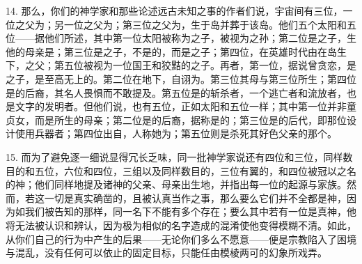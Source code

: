 14. 那么，你们的神学家和那些论述远古未知之事的作者们说，宇宙间有三位，一位之父为；另一位之父为；第三位之父为，生于岛并葬于该岛。他们五个太阳和五位——据他们所述，其中第一位太阳被称为之子，被视为之孙；第二位是之子，生他的母亲是；第三位是之子，不是的，而是之子；第四位，在英雄时代由在岛生下，之父；第五位被视为一位国王和狡黠的之子。再者，第一位，据说曾贪恋，是之子，是至高无上的。第二位在地下，自诩为。第三位其母与第三位所生；第四位是的后裔，其名人畏惧而不敢提及。第五位是的斩杀者，一个逃亡者和流放者，也是文字的发明者。但他们说，也有五位，正如太阳和五位一样；其中第一位并非童贞女，而是所生的母亲；第二位是的后裔，据称是的；第三位是的后代，即那位设计使用兵器者；第四位出自，人称她为；第五位则是杀死其好色父亲的那个。\par

15. 而为了避免逐一细说显得冗长乏味，同一批神学家说还有四位和三位，同样数目的和五位，六位和四位，三组以及同样数目的，三位有翼的，和四位被冠以之名的神；他们同样地提及诸神的父亲、母亲出生地，并指出每一位的起源与家族。然而，若这一切是真实确凿的，且被认真当作之事，那么要么它们并不全都是神，因为如我们被告知的那样，同一名下不能有多个存在；要么其中若有一位是真神，他将无法被认识和辨认，因为极为相似的名字造成的混淆使他变得模糊不清。如此，从你们自己的行为中产生的后果——无论你们多么不愿意——便是宗教陷入了困境与混乱，没有任何可以依止的固定目标，只能任由模棱两可的幻象所戏弄。\par

